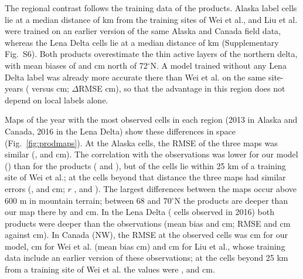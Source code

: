 The regional contrast follows the training data of the products. Alaska label cells lie at a median distance of \ndistweiAkmed{} km from the training sites of Wei et al., and Liu et al. were trained on an earlier version of the same Alaska and Canada field data, whereas the Lena Delta cells lie at a median distance of \ndistweiLemed{} km (Supplementary Fig.~S6). Both products overestimate the thin active layers of the northern delta, with mean biases of \nbiasLeNorthWei{} and \nbiasLeNorthLiu{} cm north of 72$^\circ$N. A model trained without any Lena Delta label was already more accurate there than Wei et al. on the same site-years (\ntlvprmseLeRsWeizero{} versus \ntlvprmseLeWeizero{} cm; $\Delta$RMSE \ntlvpLeRsWeizero{} cm), so that the advantage in this region does not depend on local labels alone.

Maps of the year with the most observed cells in each region (2013 in Alaska and Canada, 2016 in the Lena Delta) show these differences in space (Fig.~\ref{fig:prodmaps}). At the \nfeAkN{} Alaska cells, the RMSE of the three maps was similar (\nfeAkOof{}, \nfeAkWei{} and \nfeAkLiu{} cm). The correlation with the observations was lower for our model (\nfeAkROof) than for the products (\nfeAkRWei{} and \nfeAkRLiu), but \nfeAkNNear{} of the cells lie within 25 km of a training site of Wei et al.; at the \nfeAkNFar{} cells beyond that distance the three maps had similar errors (\nfeAkFarOof{}, \nfeAkFarWei{} and \nfeAkFarLiu{} cm; $r$ \nfeAkFarROof{}, \nfeAkFarRWei{} and \nfeAkFarRLiu). The largest differences between the maps occur above 600 m in mountain terrain; between 68 and 70$^\circ$N the products are deeper than our map there by \nmapAkFootMtnWei{} and \nmapAkFootMtnLiu{} cm. In the Lena Delta (\nfeLeN{} cells observed in 2016) both products were deeper than the observations (mean bias \nfeLeBiasWei{} and \nfeLeBiasLiu{} cm; RMSE \nfeLeWei{} and \nfeLeLiu{} cm against \nfeLeOof{} cm). In Canada (NW), the RMSE at the \nfeCaN{} observed cells was \nfeCaOof{} cm for our model, \nfeCaWei{} cm for Wei et al. (mean bias \nfeCaBiasWei{} cm) and \nfeCaLiu{} cm for Liu et al., whose training data include an earlier version of these observations; at the \nfeCaNFar{} cells beyond 25 km from a training site of Wei et al. the values were \nfeCaFarOof{}, \nfeCaFarWei{} and \nfeCaFarLiu{} cm.

